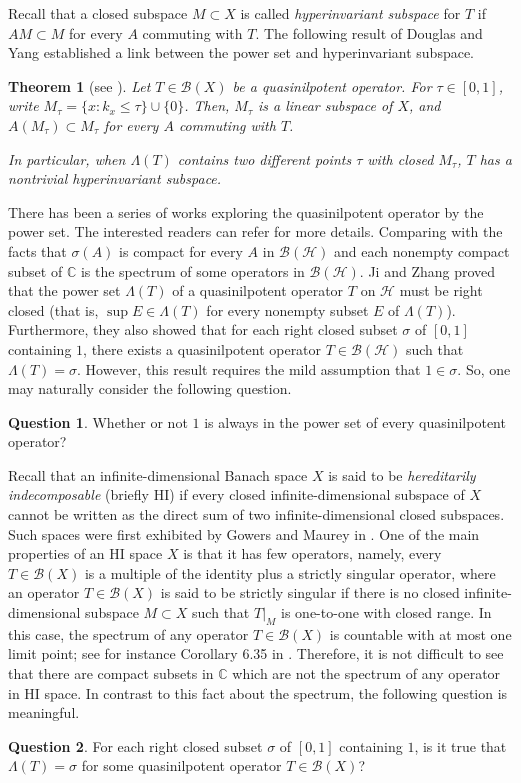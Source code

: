 \documentclass[12pt]{amsart}
\numberwithin{equation}{section}
\theoremstyle{plain}
\newtheorem{thm}{Theorem}[section]
\theoremstyle{definition}
\newtheorem{ques}{Question}
\newcommand{\bC}{{\mathbb{C}}}
\newcommand{\B}{{\mathcal{B}}}
\renewcommand{\H}{{\mathcal{H}}}
\begin{document}
Recall that a closed subspace $M\subset X$ is called {\em hyperinvariant subspace} for $T$ if $AM\subset M$ for every $A$ commuting with $T$.
The following result of
Douglas and Yang established a link between the power set and hyperinvariant subspace.
\begin{thm}[see {\cite[Proposition 7.1, Corollary 7.2]{DY3}}]\label{pthy}
Let $T\in \mathcal{B}(X)$ be a quasinilpotent operator.
For $\tau\in[0,1]$, write $M_\tau=\{x : k_{x}\leq\tau\}\cup\{0\}$.
Then, $M_\tau$ is a linear subspace of $X$, and $A(M_\tau)\subset M_\tau$ for every $A$ commuting with $T$.

In particular, when $\Lambda(T)$ contains two different points $\tau$ with closed $M_\tau$,
$T$ has a nontrivial hyperinvariant subspace.
\end{thm}
There has been a series of works exploring
the quasinilpotent operator by the power set.
The interested readers can refer
\cite{HeZhu,HuJi,JiLiu,LY2018} for more details.
Comparing with the facts that $\sigma(A)$ is compact for every $A$ in $\B(\H)$ and each nonempty compact subset of $\mathbb{C}$ is the spectrum of some operators in $\B(\H)$.
Ji and Zhang \cite{JiZhang} proved that the power set $\Lambda(T)$ of a quasinilpotent operator $T$ on $\H$ must be right closed (that is, $\sup E \in \Lambda(T)$ for every nonempty subset $E$ of $\Lambda(T)$).
Furthermore,
they also showed that for each right closed subset $\sigma$ of $[0,1]$ containing $1$, there exists a quasinilpotent operator $T\in\B(\H)$ such that $\Lambda(T)=\sigma$.
However, this result requires the mild assumption that $1\in\sigma$.
So, one may naturally consider the following question.

\begin{ques}\label{Q1}
Whether or not $1$ is always in the power set of every quasinilpotent operator?
\end{ques}

Recall that an infinite-dimensional Banach space $X$ is said to be \emph{hereditarily indecomposable} (briefly HI) if every closed
infinite-dimensional subspace of $X$ cannot be written as the direct sum of two infinite-dimensional closed subspaces.
Such spaces were first exhibited by Gowers and Maurey in \cite{GM1993}.
One of the main properties of an HI space $X$ is that it has few operators,
namely, every $T\in\B(X)$ is a multiple of the identity plus a strictly singular operator, where an operator $T\in\B(X)$ is said to be strictly singular if there is no closed infinite-dimensional subspace $M\subset X$ such that $T|_{M}$ is one-to-one with closed range.
In this case, the spectrum of any operator $T\in\B(X)$ is countable with at most one limit point; see for instance Corollary 6.35 in \cite{BM2009}.
Therefore, it is not difficult to see that there are compact subsets in $\bC$ which are not the spectrum of any operator in HI space.
In contrast to this fact about the spectrum, the following question is meaningful.
\begin{ques}\label{Q2}
For each right closed subset $\sigma$ of $[0,1]$ containing $1$, is it true that $\Lambda(T)=\sigma$ for some quasinilpotent operator $T\in\B(X)$?
\end{ques}
\end{document}
